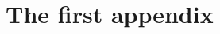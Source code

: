 \documentclass[a4paper,oneside,11pt]{report}
\begin{document}






% 
% 


\appendix


\chapter{The first appendix}




\end{document}
